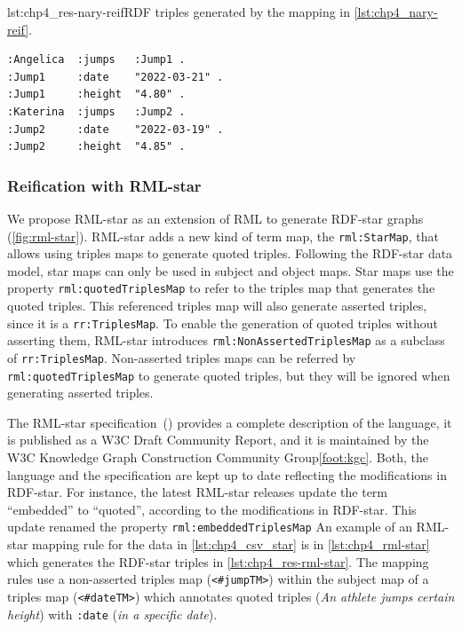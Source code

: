 \begin{minipage}{\linewidth}
\begin{captionedlisting}{lst:chp4_res-nary-reif}{RDF triples generated by the mapping in \cref{lst:chp4_nary-reif}.}
\centering
\begin{multicols}{2}
{\begin{lstlisting}[basicstyle=\ttfamily\small,label={list:example1},columns=flexible]
:Angelica  :jumps   :Jump1 .
:Jump1     :date    "2022-03-21" .
:Jump1     :height  "4.80" .
:Katerina  :jumps   :Jump2 .
:Jump2     :date    "2022-03-19" .
:Jump2     :height  "4.85" .
\end{lstlisting}}
\end{multicols}
\end{captionedlisting}
\end{minipage}




\subsubsection{Reification with RML-star}



We propose RML-star as an extension of RML to generate \mbox{RDF-star} graphs (\cref{fig:rml-star}). 
\mbox{RML-star} adds a new kind of term map, the \texttt{rml:StarMap}, that allows using triples maps to generate quoted triples. Following the \mbox{RDF-star} data model, star maps can only be used in subject and object maps. Star maps use the property \texttt{rml:quotedTri\-plesMap} to refer to the triples map that generates the quoted triples. This referenced triples map will also generate asserted triples, since it is a \texttt{rr:TriplesMap}. To enable the generation of quoted triples without asserting them, RML-star introduces \texttt{rml:NonAssertedTriplesMap} as a subclass of \texttt{rr:TriplesMap}. Non-asserted triples maps can be referred by \texttt{rml:quotedTriplesMap} to generate quoted triples, but they will be ignored when generating asserted triples.

The \mbox{RML-star} specification~(\cite{iglesias2022rmlstar}) provides a complete description of the language, it is published as a W3C Draft Community Report, and it is maintained by the W3C Knowledge Graph Construction Community Group\cref{foot:kgc}.
Both, the language and the specification are kept up to date reflecting the modifications in \mbox{RDF-star}.
For instance, the latest \mbox{RML-star} releases update the term ``embedded'' to ``quoted'',
according to the modifications in \mbox{RDF-star}.
This update renamed the property \texttt{rml:embeddedTriplesMap} 
An example of an \mbox{RML-star} mapping rule for the data in \cref{lst:chp4_csv_star} is in \cref{lst:chp4_rml-star} which generates the \mbox{RDF-star} triples in \cref{lst:chp4_res-rml-star}. 
The mapping rules use a non-asserted triples map (\texttt{<\#jumpTM>}) within the subject map of a triples map (\texttt{<\#dateTM>}) which annotates quoted triples (\textit{An athlete jumps certain height}) with \texttt{:date} (\textit{in a specific date}).

